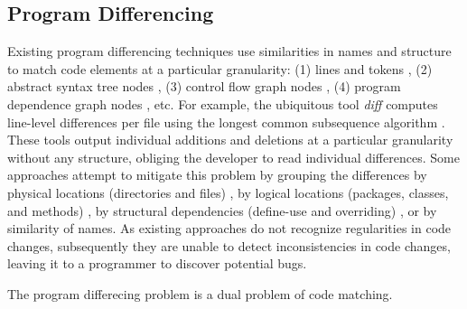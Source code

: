 \documentclass[runningheads,a4paper]{llncs}
\begin{document}
\subsection{Program Differencing} 
Existing program differencing techniques use similarities in names and structure to match code elements at a particular granularity: (1) lines and tokens \cite{Apostolico1997,Hunt1977:LCS, Reiss2008, Tichy1984}, (2) abstract syntax tree nodes \cite{Cottrell:2007,FWP2007, Hunt2002, Neamtiu2005,Raghavan:2004:Dex, Yang1991}, (3) control flow graph nodes \cite{Apiwattanapong2004, Laski1992}, (4) program dependence graph nodes \cite{Binkley1995, Horwitz1990, Jackson1994}, etc.  For example, the ubiquitous tool {\it diff} computes line-level differences per file using the longest common subsequence algorithm \cite{Hunt1977:LCS}. These tools output individual additions and deletions at a particular granularity without any structure, obliging the developer to read individual differences. Some approaches attempt to mitigate this problem by grouping the differences by physical locations (directories and files) \cite{Hunt1976}, by logical locations (packages, classes, and methods) \cite{UMLDiff2005}, by structural dependencies (define-use and overriding) \cite{Chesley2005}, or by similarity of names. 
As existing approaches do not recognize regularities in code changes, subsequently they are unable to detect inconsistencies in code changes, leaving it to a programmer to discover potential bugs.  

The program differecing problem is a dual problem of code matching.  
		\label{related_codematching}
\end{document}
